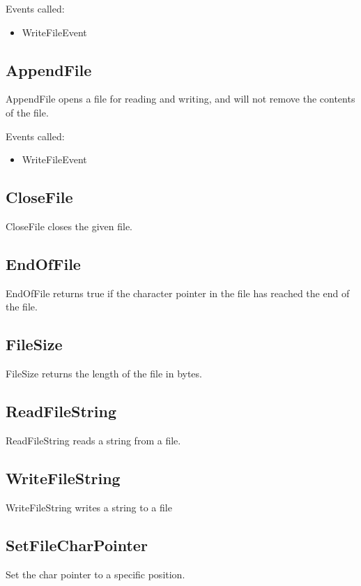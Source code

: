 \documentclass[a4paper]{report}
\begin{document}
Events called:
\begin{itemize}
\item WriteFileEvent
\end{itemize}
\subsection{AppendFile}
AppendFile opens a file for reading and writing, and will not remove the
contents of the file.

Events called:
\begin{itemize}
\item WriteFileEvent
\end{itemize}
\subsection{CloseFile}

CloseFile closes the given file.

\subsection{EndOfFile}

EndOfFile returns true if the character pointer in the file has reached the end
of the file.

\subsection{FileSize}

FileSize returns the length of the file in bytes.

\subsection{ReadFileString}

ReadFileString reads a string from a file.

\subsection{WriteFileString}

WriteFileString writes a string to a file

\subsection{SetFileCharPointer}

Set the char pointer to a specific position.
\end{document}
